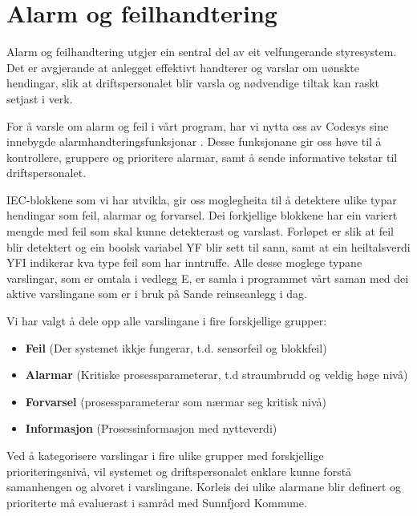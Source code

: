 \newpage
\section{Alarm og feilhandtering}
\thispagestyle{fancy}

Alarm og feilhandtering utgjer ein sentral del av eit velfungerande styresystem. Det er avgjerande
at anlegget effektivt handterer og varslar om uønskte hendingar, slik at 
driftspersonalet blir varsla og nødvendige tiltak kan raskt setjast i verk.


For å varsle om alarm og feil i vårt program, har vi nytta oss av \gls{Codesys} sine
innebygde alarmhandteringsfunksjonar \citep{CodesysAlarm}. Desse funksjonane gir oss høve til å 
kontrollere, gruppere og prioritere alarmar, samt å sende informative tekstar til driftspersonalet.

\gls{IEC}-blokkene som vi har utvikla, gir oss moglegheita til å detektere ulike typar hendingar
som feil, alarmar og forvarsel.
Dei forkjellige blokkene har ein variert mengde med feil som skal kunne detekterast og varslast.
Forløpet er slik at feil blir detektert og ein boolsk variabel \gls{YF} blir sett til sann, 
samt at ein heiltalsverdi \gls{YFI} indikerar kva type feil som har inntruffe.\newline
Alle desse moglege typane varslingar, som er omtala i vedlegg E, 
er samla i programmet vårt saman 
med dei aktive varslingane som er i bruk på Sande reinseanlegg i dag.

Vi har valgt å dele opp alle varslingane i fire forskjellige grupper:

\begin{itemize}
    \item \textbf{Feil}          (Der systemet ikkje fungerar, t.d. sensorfeil og blokkfeil)
    \item \textbf{Alarmar}       (Kritiske prosessparameterar, t.d straumbrudd og veldig høge nivå)
    \item \textbf{Forvarsel}     (prosessparameterar som nærmar seg kritisk nivå)
    \item \textbf{Informasjon}   (Prosessinformasjon med nytteverdi)
\end{itemize}

Ved å kategorisere varslingar i fire ulike grupper med forskjellige prioriteringsnivå,
vil systemet og driftspersonalet enklare kunne forstå samanhengen og alvoret i varslingane. \newline
Korleis dei ulike alarmane blir definert og prioriterte må evaluerast i samråd med \gls{Sunnfjord Kommune}.

\newpage

